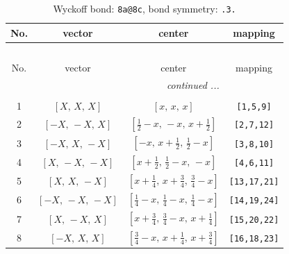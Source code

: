\documentclass[fleqn,8pt]{jsarticle}
\begin{document}
\begin{longtable}{cccc}
\caption{Wyckoff bond: {\tt 8a@8c}, bond symmetry: {\tt .3.}}
 \\
 \hline \hline
No. & vector & center & mapping \\ \hline \endfirsthead

\multicolumn{3}{l}{\tablename\ \thetable{}} \\
 \hline \hline
No. & vector & center & mapping \\ \hline \endhead

 \hline \hline
\multicolumn{3}{r}{\footnotesize\it continued ...} \\ \endfoot

 \hline \hline
\multicolumn{3}{r}{} \\ \endlastfoot

1 & $\left[ X,\, X,\, X \right]$ & $\left[ x,\, x,\, x \right]$ & {\tt [1,5,9]} \\ \hline
2 & $\left[ - X,\, - X,\, X \right]$ & $\left[ \frac{1}{2} - x,\, - x,\, x + \frac{1}{2} \right]$ & {\tt [2,7,12]} \\ \hline
3 & $\left[ - X,\, X,\, - X \right]$ & $\left[ - x,\, x + \frac{1}{2},\, \frac{1}{2} - x \right]$ & {\tt [3,8,10]} \\ \hline
4 & $\left[ X,\, - X,\, - X \right]$ & $\left[ x + \frac{1}{2},\, \frac{1}{2} - x,\, - x \right]$ & {\tt [4,6,11]} \\ \hline
5 & $\left[ X,\, X,\, - X \right]$ & $\left[ x + \frac{1}{4},\, x + \frac{3}{4},\, \frac{3}{4} - x \right]$ & {\tt [13,17,21]} \\ \hline
6 & $\left[ - X,\, - X,\, - X \right]$ & $\left[ \frac{1}{4} - x,\, \frac{1}{4} - x,\, \frac{1}{4} - x \right]$ & {\tt [14,19,24]} \\ \hline
7 & $\left[ X,\, - X,\, X \right]$ & $\left[ x + \frac{3}{4},\, \frac{3}{4} - x,\, x + \frac{1}{4} \right]$ & {\tt [15,20,22]} \\ \hline
8 & $\left[ - X,\, X,\, X \right]$ & $\left[ \frac{3}{4} - x,\, x + \frac{1}{4},\, x + \frac{3}{4} \right]$ & {\tt [16,18,23]} \\
\end{longtable}
\renewcommand{\arraystretch}{1.2}
\end{document}

